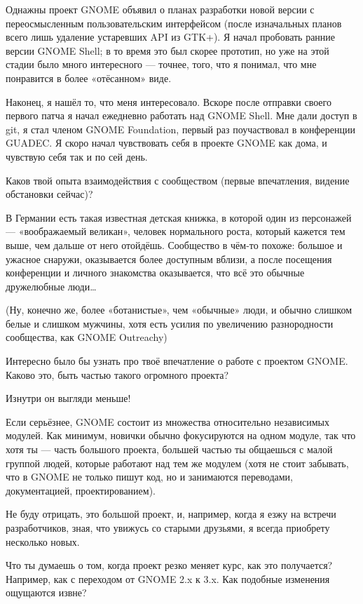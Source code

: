 \documentclass[10pt, a5paper]{article}
\begin{document}
\begin{Parallel}[p]{}{}
{Однажны проект GNOME объявил о планах разработки новой версии с переосмысленным пользовательским интерфейсом (после изначальных планов всего лишь удаление устаревших API из GTK+). Я начал пробовать ранние версии GNOME Shell; в то время это был скорее прототип, но уже на этой стадии было много интересного — точнее, того, что я понимал, что мне понравится в более «отёсанном» виде.

Наконец, я нашёл то, что меня интересовало. Вскоре после отправки своего первого патча я начал ежедневно работать над GNOME Shell. Мне дали доступ в git, я стал членом GNOME Foundation, первый раз поучаствовал в конференции GUADEC. Я скоро начал чувствовать себя в проекте GNOME как дома, {\color{red} и чувствую себя так и по сей день.}

\q Каков твой опыта взаимодействия с сообществом (первые впечатления, видение обстановки сейчас)?

\a В Германии есть такая известная детская книжка, в которой один из персонажей — «воображаемый великан», человек нормального роста, который кажется тем выше, чем дальше от него отойдёшь. Сообщество в чём-то похоже: большое и ужасное снаружи, оказывается более доступным вблизи, а после посещения конференции и личного знакомства оказывается, что всё это обычные дружелюбные люди…

(Ну, конечно же, более «ботанистые», чем «обычные» люди, и обычно слишком белые и слишком мужчины, хотя есть усилия по увеличению разнородности сообщества, как GNOME Outreachy\fakefootnote{})

\q Интересно было бы узнать про твоё впечатление о работе с проектом GNOME. Каково это, быть частью такого огромного проекта?

\a Изнутри он выгляди меньше!

Если серьёзнее, GNOME состоит из множества относительно независимых модулей. Как минимум, новички обычно фокусируются на одном модуле, так что хотя ты — часть большого проекта, большей частью ты общаешься с малой группой людей, которые работают над тем же модулем (хотя не стоит забывать, что в GNOME не только пишут код, но и занимаются переводами, документацией, {\color{red} проектированием}).

Не буду отрицать, это большой проект, и, например, когда я езжу на встречи разработчиков, зная, что увижусь со старыми друзьями, я всегда приобрету несколько новых.

\q Что ты думаешь о том, когда проект резко меняет курс, как это получается? Например, как с переходом от GNOME 2.x к 3.x. Как подобные изменения ощущаются извне?

}
\end{Parallel}
\end{document}
